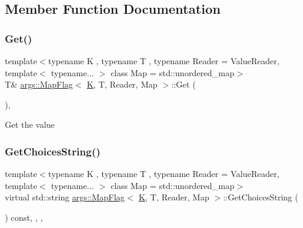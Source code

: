 \subsection{Member Function Documentation}
\mbox{\label{classargs_1_1_map_flag_ad4f1db59b839e44157c5eba9b482b75c}} 
\subsubsection{\texorpdfstring{Get()}{Get()}}
{\footnotesize\ttfamily template$<$typename K , typename T , typename Reader  = Value\+Reader, template$<$ typename... $>$ class Map = std\+::unordered\+\_\+map$>$ \\
T\& \hyperlink{classargs_1_1_map_flag}{args\+::\+Map\+Flag}$<$ \hyperlink{cgal__test_8cpp_a891e241aa245ae63618f03737efba309}{K}, T, Reader, Map $>$\+::Get (\begin{DoxyParamCaption}{ }\end{DoxyParamCaption})\hspace{0.3cm}{\ttfamily [inline]}, {\ttfamily [noexcept]}}

Get the value \mbox{\label{classargs_1_1_map_flag_a7fe91b5ef6696b82aa8999884bbf727d}} 
\subsubsection{\texorpdfstring{Get\+Choices\+String()}{GetChoicesString()}}
{\footnotesize\ttfamily template$<$typename K , typename T , typename Reader  = Value\+Reader, template$<$ typename... $>$ class Map = std\+::unordered\+\_\+map$>$ \\
virtual std\+::string \hyperlink{classargs_1_1_map_flag}{args\+::\+Map\+Flag}$<$ \hyperlink{cgal__test_8cpp_a891e241aa245ae63618f03737efba309}{K}, T, Reader, Map $>$\+::Get\+Choices\+String (\begin{DoxyParamCaption}\item[{const \hyperlink{structargs_1_1_help_params}{Help\+Params} \&}]{ }\end{DoxyParamCaption}) const\hspace{0.3cm}{\ttfamily [inline]}, {\ttfamily [override]}, {\ttfamily [protected]}, {\ttfamily [virtual]}}



